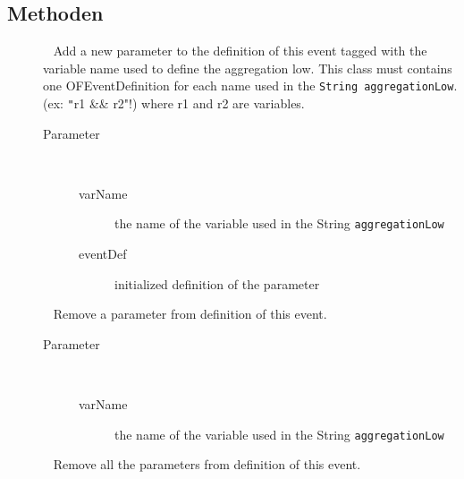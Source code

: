 \subsection{Methoden}
\begin{description}
\item[{\label{ontologyFramework.OFEventManagement.OFLogicalEventManagement.OFEventAggregation.addParameter(java.lang.String,ontologyFramework.OFEventManagement.OFLogicalEventManagement.OFEventDefinition)}}]
~ Add a new parameter to the definition of this event tagged with the variable
 name used to define the aggregation low. This class must contains one OFEventDefinition 
 for each name used in the \verb!String aggregationLow!. 
 (ex: \verb!"!r1 && r2"!) where r1 and r2 are variables.
\begin{description}
\item[Parameter] ~
\begin{description}
\item[varName]
the name of the variable used in the String \verb!aggregationLow!
\item[eventDef]
initialized definition of the parameter
\end{description}
\end{description}
\item[{\label{ontologyFramework.OFEventManagement.OFLogicalEventManagement.OFEventAggregation.removeParameterMap(java.lang.String)}}]
~ Remove a parameter from definition of this event.
\begin{description}
\item[Parameter] ~
\begin{description}
\item[varName]
the name of the variable used in the String \verb!aggregationLow!
\end{description}
\end{description}
\item[{\label{ontologyFramework.OFEventManagement.OFLogicalEventManagement.OFEventAggregation.clearParameterMap()}}]
~ Remove all the parameters from definition of this event.

\end{description}
